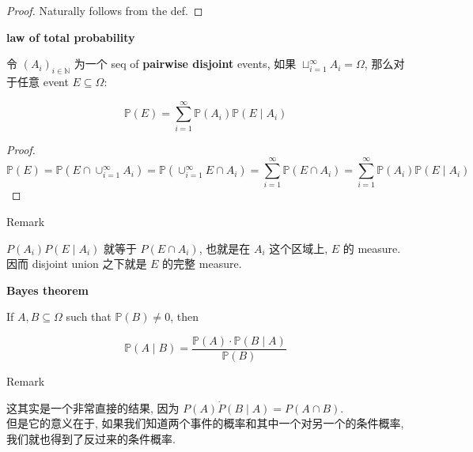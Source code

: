 \documentclass{qlnotes-export}
\begin{document}
\begin{proof}

Naturally follows from the def.

\end{proof}

\begin{theorem}{\protect{}\label{kn-law-of-total-probability}{\textbf{law
of total probability}}}

令 \(\left( A_{i} \right)_{i \in {\mathbb{N}}}\) 为一个 seq of \textbf{pairwise disjoint} events, 如果 \(\sqcup_{i = 1}^{\infty}A_{i} = \Omega\), 那么对于任意 event \(E \subseteq \Omega\):

\[{\mathbb{P}}(E) = \sum\limits_{i = 1}^{\infty}{\mathbb{P}}\left( A_{i} \right){\mathbb{P}}\left( {E \mid A_{i}} \right)\]

\end{theorem}

\begin{proof}

\[{\mathbb{P}}(E) = {\mathbb{P}}\left( {E \cap \cup_{i = 1}^{\infty}A_{i}} \right) = {\mathbb{P}}\left( {\cup_{i = 1}^{\infty}E \cap A_{i}} \right) = \sum\limits_{i = 1}^{\infty}{\mathbb{P}}\left( {E \cap A_{i}} \right) = \sum\limits_{i = 1}^{\infty}{\mathbb{P}}\left( A_{i} \right){\mathbb{P}}\left( {E \mid A_{i}} \right)\]

\end{proof}

\begin{qlremark}{Remark}

\(P(A_{i})P(E \mid A_{i})\) 就等于 \(P(E \cap A_{i})\), 也就是在 \(A_{i}\) 这个区域上, \(E\) 的 measure. 因而 disjoint union 之下就是 \(E\) 的完整 measure.

\end{qlremark}

\begin{theorem}{\protect{}\label{kn-bayes-theorem}{\textbf{Bayes theorem}}}

If \(A,B \subseteq \Omega\) such that \({\mathbb{P}}(B) \neq 0\), then

\[{\mathbb{P}}(A \mid B) = \frac{{\mathbb{P}}(A) \cdot {\mathbb{P}}(B \mid A)}{{\mathbb{P}}(B)}\]

\end{theorem}

\begin{qlremark}{Remark}

这其实是一个非常直接的结果, 因为 \(P(A)\dot{P}(B \mid A) = P(A \cap B)\).\\
但是它的意义在于, 如果我们知道两个事件的概率和其中一个对另一个的条件概率, 我们就也得到了反过来的条件概率.

\end{qlremark}
\end{document}
